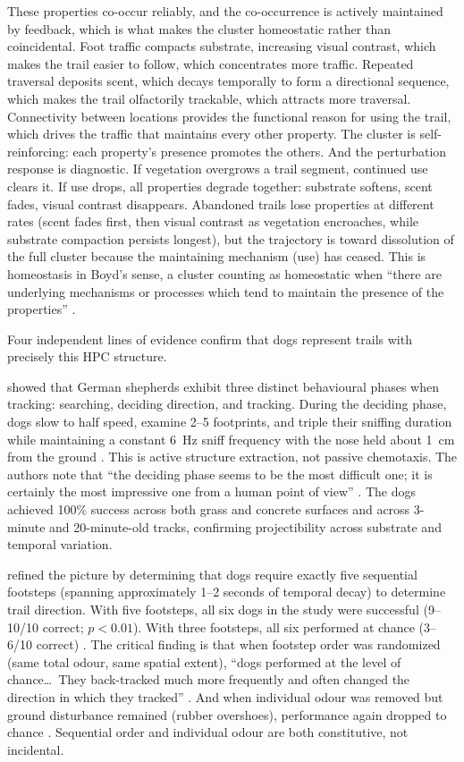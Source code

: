 \documentclass[12pt]{article}
\begin{document}
These properties co-occur reliably, and the co-occurrence is actively maintained by feedback, which is what makes the cluster homeostatic rather than coincidental. Foot traffic compacts substrate, increasing visual contrast, which makes the trail easier to follow, which concentrates more traffic. Repeated traversal deposits scent, which decays temporally to form a directional sequence, which makes the trail olfactorily trackable, which attracts more traversal. Connectivity between locations provides the functional reason for using the trail, which drives the traffic that maintains every other property. The cluster is self-reinforcing: each property's presence promotes the others. And the perturbation response is diagnostic. If vegetation overgrows a trail segment, continued use clears it. If use drops, all properties degrade together: substrate softens, scent fades, visual contrast disappears. Abandoned trails lose properties at different rates (scent fades first, then visual contrast as vegetation encroaches, while substrate compaction persists longest), but the trajectory is toward dissolution of the full cluster because the maintaining mechanism (use) has ceased. This is homeostasis in Boyd's sense, a cluster counting as homeostatic when
\enquote{there are underlying mechanisms or processes which tend to maintain the
presence of the properties} \citep[526]{boyd1993metaphor}.

Four independent lines of evidence confirm that dogs represent trails with precisely this HPC structure.

\textcite{thesen1993} showed that German shepherds exhibit three distinct behavioural phases when tracking: searching, deciding direction, and tracking. During the deciding phase, dogs slow to half speed, examine 2--5 footprints, and triple their sniffing duration while maintaining a constant 6~Hz sniff frequency with the nose held about 1~cm from the ground \citep[250--251]{thesen1993}. This is active structure extraction, not passive chemotaxis. The authors note that \enquote{the deciding phase seems to be the most difficult one; it is certainly the most impressive one from a human point of view} \citep[251]{thesen1993}. The dogs achieved 100\% success across both grass and concrete surfaces and across 3-minute and 20-minute-old tracks, confirming projectibility across substrate and temporal variation.

\textcite{hepper2005} refined the picture by determining that dogs require exactly five sequential footsteps (spanning approximately 1--2 seconds of temporal decay) to determine trail direction. With five footsteps, all six dogs in the study were successful (9--10/10 correct; $p < 0.01$). With three footsteps, all six performed at chance (3--6/10 correct) \citep[296--297]{hepper2005}. The critical finding is that when footstep order was randomized (same total odour, same spatial extent), \enquote{dogs performed at the level of chance\ldots\ They back-tracked much more frequently and often changed the direction in which they tracked} \citep[294]{hepper2005}. And when individual odour was removed but ground disturbance remained (rubber overshoes), performance again dropped to chance \citep[295]{hepper2005}. Sequential order and individual odour are both constitutive, not incidental.
\end{document}
